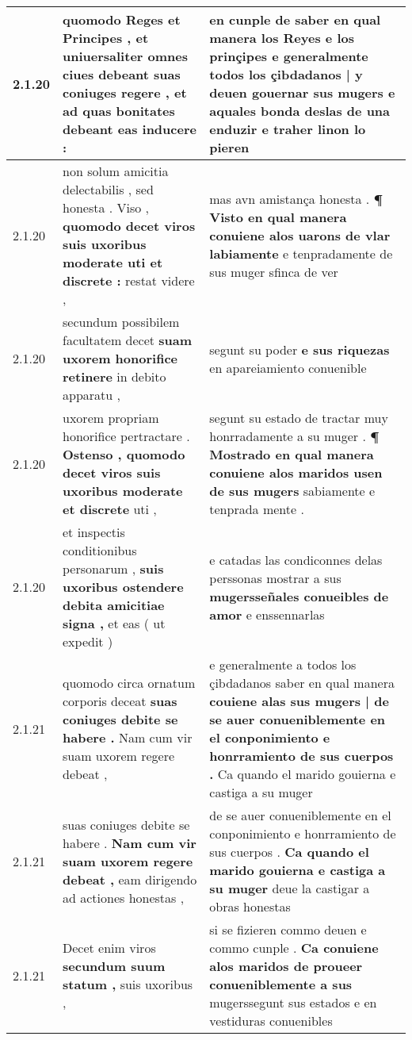 \begin{tabular}{|p{1cm}|p{6.5cm}|p{6.5cm}|}
2.1.20 & quomodo Reges et Principes , \textbf{ et uniuersaliter omnes ciues debeant suas coniuges regere , } et ad quas bonitates debeant eas inducere : & en cunple de saber en qual manera los Reyes e los prinçipes \textbf{ e generalmente todos los çibdadanos | y deuen gouernar sus mugers } e aquales bonda deslas de una enduzir e traher linon lo pieren \\\hline
2.1.20 & non solum amicitia delectabilis , sed honesta . Viso , \textbf{ quomodo decet viros suis uxoribus moderate uti et discrete : } restat videre , & mas avn amistança honesta . \textbf{ ¶ Visto en qual manera conuiene alos uarons de vlar labiamente } e tenpradamente de sus muger sfinca de ver \\\hline
2.1.20 & secundum possibilem facultatem decet \textbf{ suam uxorem honorifice retinere } in debito apparatu , & segunt su poder \textbf{ e sus riquezas } en apareiamiento conuenible \\\hline
2.1.20 & uxorem propriam honorifice pertractare . \textbf{ Ostenso , quomodo decet viros suis uxoribus moderate et discrete } uti , & segunt su estado de tractar muy honrradamente a su muger . \textbf{ ¶ Mostrado en qual manera conuiene alos maridos usen de sus mugers } sabiamente e tenprada mente . \\\hline
2.1.20 & et inspectis conditionibus personarum , \textbf{ suis uxoribus ostendere debita amicitiae signa , } et eas ( ut expedit ) & e catadas las condiconnes delas perssonas mostrar a sus \textbf{ mugersseñales conueibles de amor } e enssennarlas \\\hline
2.1.21 & quomodo circa ornatum corporis deceat \textbf{ suas coniuges debite se habere . } Nam cum vir suam uxorem regere debeat , & e generalmente a todos los çibdadanos saber en qual manera \textbf{ couiene alas sus mugers | de se auer conueniblemente en el conponimiento e honrramiento de sus cuerpos . } Ca quando el marido gouierna e castiga a su muger \\\hline
2.1.21 & suas coniuges debite se habere . \textbf{ Nam cum vir suam uxorem regere debeat , } eam dirigendo ad actiones honestas , & de se auer conueniblemente en el conponimiento e honrramiento de sus cuerpos . \textbf{ Ca quando el marido gouierna e castiga a su muger } deue la castigar a obras honestas \\\hline
2.1.21 & Decet enim viros \textbf{ secundum suum statum , } suis uxoribus , & si se fizieren commo deuen e commo cunple . \textbf{ Ca conuiene alos maridos de proueer conueniblemente a sus } mugerssegunt sus estados e en vestiduras conuenibles \\\hline

\end{tabular}
